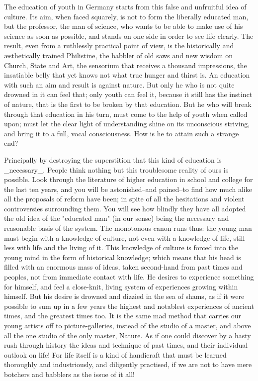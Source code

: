 The education of youth in Germany starts from this false and
unfruitful idea of culture. Its aim, when faced squarely, is not to
form the liberally educated man, but the professor, the man of
science, who wants to be able to make use of his science as soon as
possible, and stands on one side in order to see life clearly. The
result, even from a ruthlessly practical point of view, is the
historically and æsthetically trained Philistine, the babbler of old
saws and new wisdom on Church, State and Art, the sensorium that
receives a thousand impressions, the insatiable belly that yet knows
not what true hunger and thirst is. An education with such an aim and
result is against nature. But only he who is not quite drowned in it
can feel that; only youth can feel it, because it still has the
instinct of nature, that is the first to be broken by that education.
But he who will break through that education in his turn, must come
to the help of youth when called upon; must let the clear light of
understanding shine on its unconscious striving, and bring it to a
full, vocal consciousness. How is he to attain such a strange end?

Principally by destroying the superstition that this kind of
education is _necessary_. People think nothing but this troublesome
reality of ours is possible. Look through the literature of higher
education in school and college for the last ten years, and you will
be astonished--and pained--to find how much alike all the proposals
of reform have been; in spite of all the hesitations and violent
controversies surrounding them. You will see how blindly they have
all adopted the old idea of the "educated man" (in our sense) being
the necessary and reasonable basis of the system. The monotonous
canon runs thus: the young man must begin with a knowledge of
culture, not even with a knowledge of life, still less with life and
the living of it. This knowledge of culture is forced into the young
mind in the form of historical knowledge; which means that his head
is filled with an enormous mass of ideas, taken second-hand from past
times and peoples, not from immediate contact with life. He desires
to experience something for himself, and feel a close-knit, living
system of experiences growing within himself. But his desire is
drowned and dizzied in the sea of shams, as if it were possible to
sum up in a few years the highest and notablest experiences of
ancient times, and the greatest times too. It is the same mad method
that carries our young artists off to picture-galleries, instead of
the studio of a master, and above all the one studio of the only
master, Nature. As if one could discover by a hasty rush through
history the ideas and technique of past times, and their individual
outlook on life! For life itself is a kind of handicraft that must be
learned thoroughly and industriously, and diligently practised, if we
are not to have mere botchers and babblers as the issue of it all!

